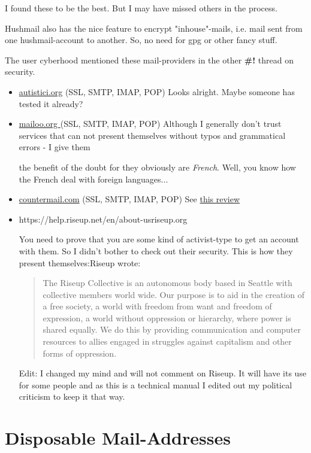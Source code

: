 \documentclass{article}
\begin{document}
 I found these to be the best. But I may have missed others in the process. 


Hushmail also has the nice feature to encrypt "inhouse"-mails, i.e. mail sent from one hushmail-account to another. So, no need for gpg or other fancy stuff. 


 The user cyberhood mentioned these mail-providers in the other \textbf{\#!} thread on security.
\begin{itemize}
	 \item \href{http://www.autistici.org/en/services/mail.html}{ autistici.org} (SSL, SMTP, IMAP, POP) Looks alright. Maybe someone has tested it already?
	 \item \href{https://www.mailoo.org/}{ mailoo.org } (SSL, SMTP, IMAP, POP) Although I generally don't trust services that can not present themselves without typos and grammatical errors - I give them 

the benefit of the doubt for they obviously are \emph{French}. Well, you know how the French deal with foreign languages... 
	 \item \href{https://countermail.com/}{ countermail.com} (SSL, SMTP, IMAP, POP) See \href{http://securitynirvana.blogspot.de/2012/05/countermail-protecting-your-privacy.html}{this review}
	 \item{https://help.riseup.net/en/about-us}{riseup.org}
	  

 You need to prove that you are some kind of activist-type to get an account with them. So I didn't bother to check out their security. This is how they present themselves:{\sc Riseup wrote:}\begin{quotation}
	  

 The Riseup Collective is an autonomous body based in Seattle with collective members world wide. Our purpose is to aid in the creation of a free society, a world with freedom from want and freedom of expression, a world without oppression or hierarchy, where power is shared equally. We do this by providing communication and computer resources to allies engaged in struggles against capitalism and other forms of oppression.\end{quotation}
	  

 Edit: I changed my mind and will not comment on Riseup. It will have its use for some people and as this is a technical manual I edited out my political criticism to keep it that way.
  \end{itemize}


 
\section{Disposable Mail-Addresses}
\end{document}
